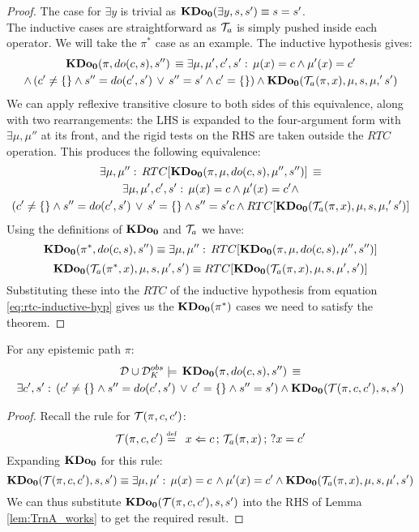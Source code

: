 \begin{proof}
The case for $\exists y$ is trivial as $\mathbf{KDo_{0}}(\exists y,s,s')\equiv s=s'$.\\


The inductive cases are straightforward as $\mathcal{T}_{a}$ is simply pushed
inside each operator. We will take the $\pi^{*}$ case as an example.
The inductive hypothesis gives:\begin{multline*}
\mathbf{KDo_{0}}(\pi,do(c,s),s'')\,\equiv\exists\mu,\mu',c',s':\,\mu(x)=c\wedge\mu'(x)=c'\\
\wedge\left(c'\neq\{\}\wedge s''=do(c',s')\,\vee\, s''=s'\wedge c'=\{\}\right)\wedge\mathbf{KDo_{0}}(\mathcal{T}_{a}(\pi,x),\mu,s,\mu,'s')\end{multline*}
 We can apply reflexive transitive closure to both sides of this equivalence,
along with two rearrangements: the LHS is expanded to the four-argument
form with $\exists\mu,\mu''$ at its front, and the rigid tests on
the RHS are taken outside the $RTC$ operation. This produces the
following equivalence:\begin{multline}
\exists\mu,\mu'':\, RTC[\mathbf{KDo_{0}}(\pi,\mu,do(c,s),\mu'',s'')]\,\equiv\\
\exists\mu,\mu',c',s':\,\mu(x)=c\wedge\mu'(x)=c'\wedge\\
(c'\neq\{\}\wedge s''=do(c',s')\,\vee\, s'=\{\}\wedge s''=s'c\wedge RTC[\mathbf{KDo_{0}}(\mathcal{T}_{a}(\pi,x),\mu,s,\mu,'s')]\label{eq:rtc-inductive-hyp}\end{multline}
 Using the definitions of $\mathbf{KDo_{0}}$ and $\mathcal{T}_{a}$ we have:\[
\mathbf{KDo_{0}}(\pi^{*},do(c,s),s'')\equiv\exists\mu,\mu'':\, RTC[\mathbf{KDo_{0}}(\pi,\mu,do(c,s),\mu'',s'')]\]
 \[
\mathbf{KDo_{0}}(\mathcal{T}_{a}(\pi^{*},x),\mu,s,\mu',s')\equiv RTC[\mathbf{KDo_{0}}(\mathcal{T}_{a}(\pi,x),\mu,s,\mu',s')]\]
 Substituting these into the $RTC$ of the inductive hypothesis from
equation \eqref{eq:rtc-inductive-hyp} gives us the $\mathbf{KDo_{0}}(\pi^{*})$
cases we need to satisfy the theorem. 
\end{proof}
\medskip{}


\begin{thmext}
[\ref{thm:Trn-respects-epi-paths}] For any epistemic path
$\pi$:\begin{multline*}
\mathcal{D}\cup\mathcal{D}_{K}^{obs}\models\,\mathbf{KDo_{0}}(\pi,do(c,s),s'')\,\equiv\\
\exists c',s':\,\left(c'\neq\{\}\wedge s''=do(c',s')\,\vee\, c'=\{\}\wedge s''=s'\right)\wedge\mathbf{KDo_{0}}(\mathcal{T}(\pi,c,c'),s,s')\end{multline*}

\end{thmext}
\begin{proof}
Recall the rule for $\mathcal{T}(\pi,c,c')$:\[
\mathcal{T}(\pi,c,c')\stackrel{\mbox{\tiny def}}{=}\,\,\, x\Leftarrow c\,;\,\mathcal{T}_{a}(\pi,x)\,;\,?x=c'\]
 Expanding $\mathbf{KDo_{0}}$ for this rule:\[
\mathbf{KDo_{0}}(\mathcal{T}(\pi,c,c'),s,s')\equiv\exists\mu,\mu':\,\mu(x)=c\,\wedge\mu'(x)=c'\wedge\mathbf{KDo_{0}}(\mathcal{T}_{a}(\pi,x),\mu,s,\mu',s')\]
 We can thus substitute $\mathbf{KDo_{0}}(\mathcal{T}(\pi,c,c'),s,s')$ into the RHS
of Lemma \ref{lem:TrnA_works} to get the required result. 
\end{proof}
\medskip{}


